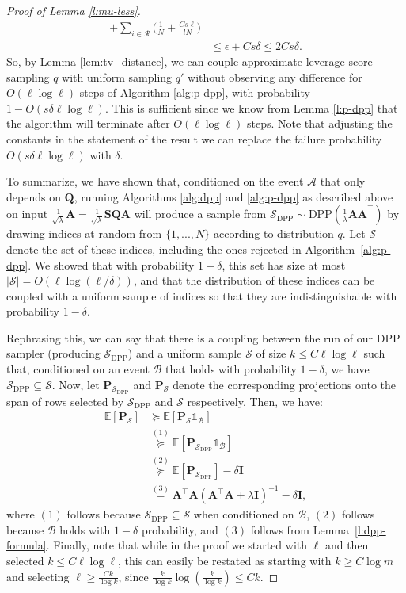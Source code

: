 \documentclass[11pt]{article}
\let\origtop\top
\renewcommand\top{{\scriptscriptstyle{\origtop}}}
\def\DPP{\mathrm{DPP}}
\def\A{{\mathbf A}}
\def\I{{\mathbf I}}
\def\Q{{\mathbf Q}}
\def\S{{\mathbf S}}
\def\setR{{\mathcal R}}
\def\setS{{\mathcal S}}
\def\P{{\mathbf P}}
\def\E{{\mathds E}}
\def\one{{\mathds{1}}}
\begin{document}
\begin{proof}[Proof of Lemma \ref{l:mu-less}]
\begin{align*}
      + \sum_{i\in \bar \setR}\Big(\frac{1}{N} + \frac {Cs\ell}{lN}\Big)
      \\
     &\leq \epsilon + Cs\delta \leq 2Cs\delta.
\end{align*}
So, by Lemma \ref{lem:tv_distance}, we can couple approximate leverage score sampling $q$ with
  uniform sampling $q'$
without observing any difference for $O(\ell\log \ell)$ steps of Algorithm \ref{alg:p-dpp}, with probability $1- O(s\delta \ell\log \ell)$. This is sufficient since we know from Lemma \ref{l:p-dpp} that the algorithm will terminate after $O(\ell\log \ell)$ steps. Note that adjusting the constants in the statement of the result we can replace the failure probability $O(s\delta \ell\log \ell)$ with $\delta$. 

To summarize, we have shown that, conditioned on the event $\mathcal A$ that only depends on $\Q$, running Algorithms \ref{alg:dpp} and \ref{alg:p-dpp} as described above on input $\frac1{\sqrt\lambda}\bar\A=\frac1{\sqrt\lambda}\bar\S\Q\A$ will produce a sample from $\setS_{\DPP}\sim\DPP(\frac1\lambda\bar\A\bar\A^\top)$ by drawing indices at random from $\{1,...,N\}$ according to distribution $q$. Let $\setS$ denote the set of these indices, including the ones rejected in Algorithm~\ref{alg:p-dpp}. We showed that with probability $1-\delta$, this set has size at most $|\setS| = O(\ell\log (\ell/\delta))$, and that the distribution of these indices can be coupled with a uniform sample of indices so that they are indistinguishable with probability $1-\delta$. 

Rephrasing this, we can say that there is a coupling between the run of our DPP sampler (producing $\setS_{\DPP}$) and a uniform sample 
$\setS$ of size $k \leq C\ell\log \ell$ 
such that, conditioned on an event $\mathcal {B}$ that holds with probability $1-\delta$, we have $\setS_{\DPP}\subseteq \setS$. Now, let $\P_{\setS_{\DPP}}$ and $\P_\setS$ denote the corresponding projections onto the span of rows selected by $\setS_{\DPP}$ and $\setS$ respectively. Then, we have:
\begin{align*}
    \E[\P_\setS] &\succeq \E[\P_\setS\one_{\mathcal B}] 
    \\
    &\overset{(1)}{\succeq} \E[\P_{\setS_{\DPP}}\one_{\mathcal B}]
    \\
    &\overset{(2)}{\succeq} \E[\P_{\setS_{\DPP}}] - \delta\I
    \\
    &\overset{(3)}{=} \A^\top\A(\A^\top\A+\lambda\I)^{-1} - \delta\I,
\end{align*}
where $(1)$ follows because $\setS_{\DPP}\subseteq \setS$ when conditioned on $\mathcal B$, $(2)$ follows because $\mathcal B$ holds with $1-\delta$ probability, and $(3)$ follows from Lemma~\ref{l:dpp-formula}. Finally, note that while in the proof we started with $\ell$ and then selected $k \leq C\ell \log \ell$,
this can easily be restated as starting with $k\geq C\log m$ 
and selecting 
$\ell\geq \frac {Ck}{\log k}$, since $\frac k{\log k}\log(\frac k{\log k}) \leq Ck$.
\end{proof}
\end{document}
